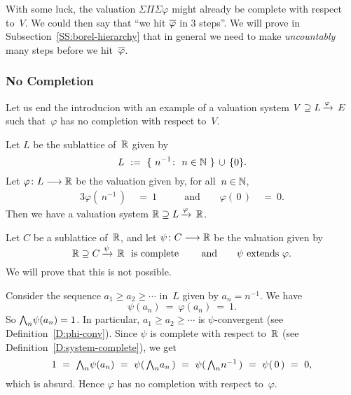 With some luck, the valuation $\Sigma\Pi\Sigma \varphi$
might already be complete with respect to~$V$.
We could then say that ``we hit $\overline\varphi$ in $3$ steps''.
We will prove in Subsection~\ref{SS:borel-hierarchy}
that in general
we need to make \emph{uncountably} many steps
before we hit~$\overline\varphi$. {}


\subsubsection*{No Completion}
Let us end the introducion
with an example
of a valuation
system $V \supseteq L\,\smash{\xrightarrow{\varphi}\,E}$
such that~$\varphi$ has no completion with respect to~$V$.
\begin{ex}
\label{E:no-completion}
Let $L$ be the sublattice of~$\mathbb{R}$ given by
\begin{equation*}
L\ :=\ \{ \ n^{-1}\colon\ n\in\mathbb{N}\ \} \,\cup\, \{0\}.
\end{equation*}
Let $\varphi\colon L \longrightarrow \mathbb{R}$
be the valuation given by, for all~$n\in\mathbb{N}$,
\begin{alignat*}{3}
\varphi(\,n^{-1}\,) \ &=\ 1&\qquad\text{and}\qquad
\varphi(\,0\,) \ &=\ 0.
\end{alignat*}
Then we have a valuation system $\mathbb{R} \supseteq L\,\smash{\xrightarrow{\varphi}\,\mathbb{R}}$.

Let $C$ be a sublattice of~$\mathbb{R}$,
and let $\psi\colon C \longrightarrow \mathbb{R}$
be the valuation given by
\begin{equation*}
\vs{\R}{C}\psi\R\text{ \ is complete }
\qquad\text{and}\qquad
\psi\text{ extends }\varphi.
\end{equation*}
We will prove that this is not possible.

Consider the sequence $a_1 \geq a_2 \geq \dotsb$ in~$L$
given by $a_n = n^{-1}$.
We have 
\begin{equation*}
\psi(a_n) \ =\  \varphi(a_n) \ =\  1.
\end{equation*}
So $\textstyle{\bigwedge}_n \psi(a_n) = 1$.
In particular,
$a_1 \geq a_2 \geq \dotsb$ is $\psi$-convergent
(see Definition~\ref{D:phi-conv}).
Since $\psi$ is complete with respect to~$\mathbb{R}$
(see Definition~\ref{D:system-complete}), 
we get
\begin{equation*}
1\ = \ 
\bw_n \psi( a_n ) \ = \  \psi(\, \bw_n a_n \,)
\ =\ \psi(\,\bw_n n^{-1}\,)
\ =\ \psi(\, 0\, ) \ =\  0,
\end{equation*}
which is absurd.
Hence $\varphi$ has no completion with respect to~$\varphi$.

\end{ex}

